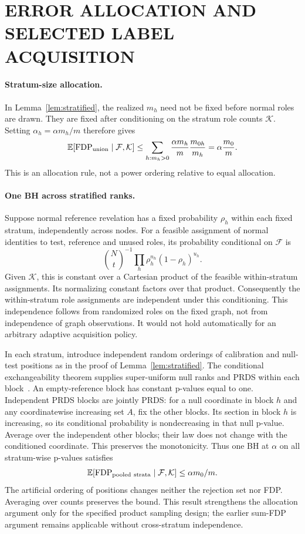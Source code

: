 \section{ERROR ALLOCATION AND SELECTED LABEL ACQUISITION}
\label{app:allocation}
\paragraph{Stratum-size allocation.}
In Lemma~\ref{lem:stratified}, the realized $m_h$ need not be fixed before normal roles are drawn. They are fixed after conditioning on the stratum role counts $\mathcal K$. Setting $\alpha_h=\alpha m_h/m$ therefore gives
\[
\mathbb{E}[\operatorname{FDP}_{\rm union}\mid\mathcal F,\mathcal K]
\le \sum_{h:m_h>0}\frac{\alpha m_h}{m}\frac{m_{0h}}{m_h}
=\alpha\frac{m_0}{m}.
\]
This is an allocation rule, not a power ordering relative to equal allocation.

\paragraph{One BH across stratified ranks.}
Suppose normal reference revelation has a fixed probability $\rho_h$ within each fixed stratum, independently across nodes. For a feasible assignment of normal identities to test, reference and unused roles, its probability conditional on $\mathcal F$ is
\[
\binom Nt^{-1}\prod_h\rho_h^{n_h}(1-\rho_h)^{u_h}.
\]
Given $\mathcal K$, this is constant over a Cartesian product of the feasible within-stratum assignments. Its normalizing constant factors over that product. Consequently the within-stratum role assignments are independent under this conditioning. This independence follows from randomized roles on the fixed graph, not from independence of graph observations. It would not hold automatically for an arbitrary adaptive acquisition policy.

In each stratum, introduce independent random orderings of calibration and null-test positions as in the proof of Lemma~\ref{lem:stratified}. The conditional exchangeability theorem supplies super-uniform null ranks and PRDS within each block~\citep[Theorem 3.3]{marandon2024adaptive}. An empty-reference block has constant p-values equal to one. Independent PRDS blocks are jointly PRDS: for a null coordinate in block $h$ and any coordinatewise increasing set $A$, fix the other blocks. Its section in block $h$ is increasing, so its conditional probability is nondecreasing in that null p-value. Average over the independent other blocks; their law does not change with the conditioned coordinate. This preserves the monotonicity. Thus one BH at $\alpha$ on all stratum-wise p-values satisfies
\[
\mathbb{E}[\operatorname{FDP}_{\rm pooled\ strata}\mid\mathcal F,\mathcal K]
\le\alpha m_0/m.
\]
The artificial ordering of positions changes neither the rejection set nor FDP. Averaging over counts preserves the bound. This result strengthens the allocation argument only for the specified product sampling design; the earlier sum-FDP argument remains applicable without cross-stratum independence.

